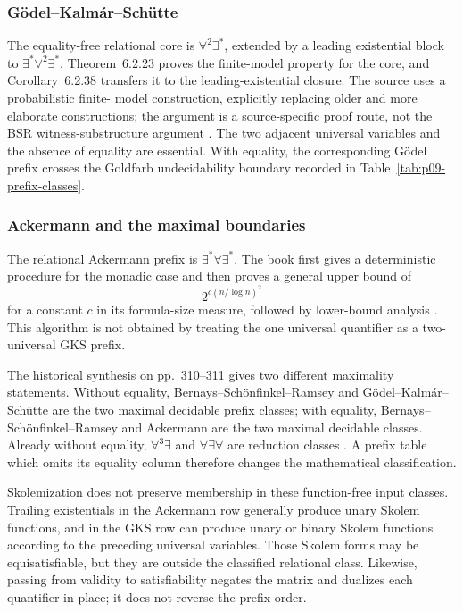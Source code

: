 \subsubsection{G\"odel--Kalm\'ar--Sch\"utte}

The equality-free relational core is \(\forall^2\exists^*\), extended by a
leading existential block to \(\exists^*\forall^2\exists^*\).  Theorem~6.2.23
proves the finite-model property for the core, and Corollary~6.2.38 transfers it
to the leading-existential closure.  The source uses a probabilistic finite-
model construction, explicitly replacing older and more elaborate
constructions; the argument is a source-specific proof route, not the BSR
witness-substructure argument \cite[pp.~261--269]{BorgerGradelGurevich1997}.
The two adjacent universal variables and the absence of equality are essential.
With equality, the corresponding G\"odel prefix crosses the Goldfarb
undecidability boundary recorded in Table~\ref{tab:p09-prefix-classes}.

\subsubsection{Ackermann and the maximal boundaries}

The relational Ackermann prefix is \(\exists^*\forall\exists^*\).  The book
first gives a deterministic procedure for the monadic case and then proves a
general upper bound of
\[
 2^{c(n/\log n)^2}
\]
for a constant \(c\) in its formula-size measure, followed by lower-bound
analysis \cite[thms.~6.3.24 and 6.3.26]{BorgerGradelGurevich1997}.  This
algorithm is not obtained by treating the one universal quantifier as a
two-universal GKS prefix.

The historical synthesis on pp.~310--311 gives two different maximality
statements.  Without equality, Bernays--Sch\"onfinkel--Ramsey and
G\"odel--Kalm\'ar--Sch\"utte are the two maximal decidable prefix classes;
with equality, Bernays--Sch\"onfinkel--Ramsey and Ackermann are the two maximal
decidable classes.  Already without equality, \(\forall^3\exists\) and
\(\forall\exists\forall\) are reduction classes
\cite[pp.~310--311]{BorgerGradelGurevich1997}.  A prefix table which omits its
equality column therefore changes the mathematical classification.

Skolemization does not preserve membership in these function-free input
classes.  Trailing existentials in the Ackermann row generally produce unary
Skolem functions, and in the GKS row can produce unary or binary Skolem
functions according to the preceding universal variables.  Those Skolem forms
may be equisatisfiable, but they are outside the classified relational class.
Likewise, passing from validity to satisfiability negates the matrix and dualizes
each quantifier in place; it does not reverse the prefix order.

